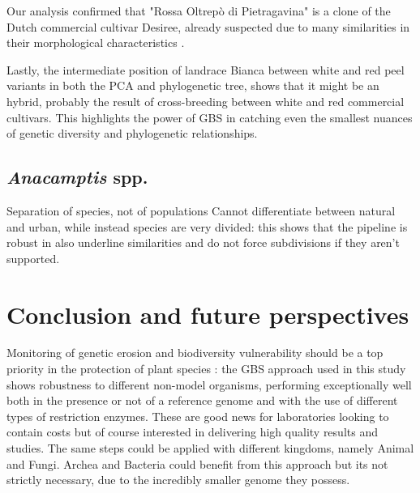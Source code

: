 \documentclass[a4paper, 12pt]{report}
\begin{document}
Our analysis confirmed that "Rossa Oltrepò di Pietragavina" is a clone of the Dutch commercial cultivar Desiree, already suspected due to many similarities in their morphological characteristics \parencite{rossiVarietaAgronomicheLombarde2019}.

Lastly, the intermediate position of landrace Bianca between white and red peel variants in both the PCA and phylogenetic tree, shows that it might be an hybrid, probably the result of cross-breeding between white and red commercial cultivars. This highlights the power of GBS in catching even the smallest nuances of genetic diversity and phylogenetic relationships.


\clearpage
\section{\textit{Anacamptis} spp.}
\vspace{-1.5em}
Separation of species, not of populations
Cannot differentiate between natural and urban, while instead species are very divided: this shows that the pipeline is robust in also underline similarities and do not force subdivisions if they aren't supported.


\clearpage
\chapter{Conclusion and future perspectives}
Monitoring of genetic erosion and biodiversity vulnerability should be a top priority in the protection of plant species \parencite{salgotraGeneticDiversityConservation2023}: the GBS approach used in this study shows robustness to different non-model organisms, performing exceptionally well both in the presence or not of a reference genome and with the use of different types of restriction enzymes. These are good news for laboratories looking to contain costs but of course interested in delivering high quality results and studies. The same steps could be applied with different kingdoms, namely Animal and Fungi. Archea and Bacteria could benefit from this approach but its not strictly necessary, due to the incredibly smaller genome they possess. 
\end{document}
